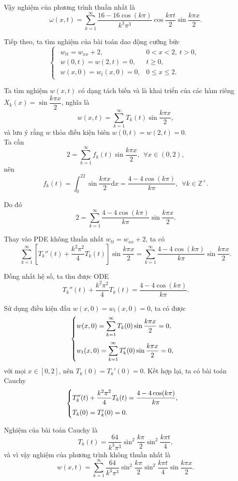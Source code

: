 \documentclass[10pt, a4paper]{article}
\begin{document}
	Vậy nghiệm của phương trình thuần nhất là $$\omega(x,t)=\sum_{k=1}^\infty\frac{16-16\cos(k\pi)}{k^3\pi^3}\cos\frac{k\pi t}{2}\sin\frac{k\pi x}{2}.$$
	
	Tiếp theo, ta tìm nghiệm của bài toán dao động cưỡng bức $$\begin{cases}
		\begin{array}{ll}
			w_{tt}=w_{xx}+2, & 0<x<2,~t>0,\\
			w(0,t)=w(2,t)=0, & t\ge0,\\
			w(x,0)=w_t(x,0)=0, & 0\le x\le 2.
		\end{array}
	\end{cases}$$
	
	Ta tìm nghiệm $w(x,t)$ có dạng tách biến và là khai triển của các hàm riêng $X_k(x)=\sin\dfrac{k\pi x}{2}$, nghĩa là $$w(x,t)=\sum_{k=1}^\infty T_k(t)\sin\frac{k\pi x}{2},$$
	và lưu ý rằng $w$ thỏa điều kiện biên $w(0,t)=w(2,t)=0$.\\
	
	Ta cần $$2=\sum_{k=1}^\infty f_k(t)\sin\frac{k\pi x}{2},~~\forall x\in(0,2),$$
	nên $$f_k(t)=\int_0^22\sin\frac{k\pi x}{2}\mathrm dx=\frac{4-4\cos(k\pi)}{k\pi},~~\forall k\in\mathbb Z^+.$$
	
	Do đó $$2=\sum_{k=1}^\infty\frac{4-4\cos(k\pi)}{k\pi}\sin\frac{k\pi x}{2}.$$
	
	Thay vào PDE không thuần nhất $w_{tt}=w_{xx}+2$, ta có $$\sum_{k=1}^\infty\left[T_k''(t)+\frac{k^2\pi^2}{4}T_k(t)\right]\sin\frac{k\pi x}{2}=\sum_{k=1}^\infty\frac{4-4\cos(k\pi)}{k\pi}\sin\frac{k\pi x}{2}.$$
	
	Đồng nhất hệ số, ta thu được ODE $$T_k''(t)+\frac{k^2\pi^2}{4}T_k(t)=\frac{4-4\cos(k\pi)}{k\pi}.$$
	
	Sử dụng điều kiện đầu $w(x,0)=w_t(x,0)=0$, ta có được $$\begin{cases}
		w(x,0)=\displaystyle\sum_{k=1}^\infty T_k(0)\sin\frac{k\pi x}{2}=0,\\
		\noalign{\vskip7pt}
		w_t(x,0)=\displaystyle\sum_{k=1}^\infty T_k'(0)\sin\frac{k\pi x}{2}=0,
	\end{cases}$$
	với mọi $x\in[0,2]$, nên $T_k(0)=T_k'(0)=0$. Kết hợp lại, ta có bài toán Cauchy $$\begin{cases}
		T_k''(t)+\dfrac{k^2\pi^2}{4}T_k(t)=\dfrac{4-4\cos(k\pi)}{k\pi},\\
		\noalign{\vskip5pt}
		T_k(0)=T_k'(0)=0.
	\end{cases}$$
	
	Nghiệm của bài toán Cauchy là $$T_k(t)=\frac{64}{k^3\pi^3}\sin^2\frac{k\pi}{2}\sin^2\frac{k\pi t}{4},$$
	và vì vậy nghiệm của phương trình không thuần nhất là $$w(x,t)=\sum_{k=1}^\infty\frac{64}{k^3\pi^3}\sin^2\frac{k\pi}{2}\sin^2\frac{k\pi t}{4}\sin\frac{k\pi x}{2}.$$
	
\end{document}
